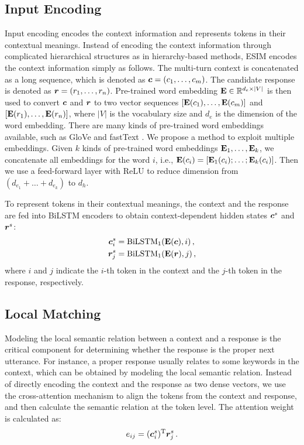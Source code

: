 \documentclass[letterpaper]{article} \usepackage{aaai19}  \usepackage{times}  \usepackage{helvet}  \usepackage{courier}  \usepackage{url}  \usepackage{graphicx}
\newcommand{\mat}[1]{\bf{#1}}
\newcommand{\RR}{\mathbb{R}}
\begin{document}
\subsection{Input Encoding}
\label{sec:input}
Input encoding encodes the context information and represents tokens in their contextual meanings. Instead of encoding the context information through complicated hierarchical structures as in hierarchy-based methods, ESIM encodes the context information simply as follows. The multi-turn context is concatenated as a long sequence, which is denoted as $\bm{c} = (c_1,\dots,c_m)$. The candidate response is denoted as $\bm{r} = (r_1,\dots,r_{n})$. Pre-trained word embedding ${\mat E} \in \RR^{d_e \times |V|}$ is then used to convert $\bm{c}$ and $\bm{r}$ to two vector sequences $[{\mat E}(c_1),\dots,{\mat E}(c_m)]$ and $[{\mat E}(r_1),\dots,{\mat E}(r_n)]$, where $|V|$ is the vocabulary size and $d_e$ is the dimension of the word embedding. There are many kinds of pre-trained word embeddings available, such as GloVe \cite{DBLP:conf/emnlp/PenningtonSM14} and fastText \cite{DBLP:conf/lrec/MikolovGBPJ18}. We propose a method to exploit multiple embeddings. Given $k$ kinds of pre-trained word embeddings ${\mat E}_1, \dots, {\mat E}_k$, we concatenate all embeddings for the word $i$, i.e., ${\mat E}(c_i) = [{\mat E}_1(c_i);\dots;{\mat E}_k(c_i)]$. Then we use a feed-forward layer with ReLU to reduce dimension from $(d_{e_1}+\dots+d_{e_k})$ to $d_h$.

To represent tokens in their contextual meanings, the context and the response are fed into BiLSTM encoders to obtain context-dependent hidden states ${\bm{c}}^s$ and ${\bm{r}}^s$:
\begin{align}
{\vect c}^s_i &=\mathrm{BiLSTM}_1({\mat E}(\vect{c}),i) \,,\\
{\vect r}^s_j &=\mathrm{BiLSTM}_1({\mat E}(\vect{r}),j) \,,
\end{align}
\noindent where $i$ and $j$ indicate the $i$-th token in the context and the $j$-th token in the response, respectively.

\subsection{Local Matching}
Modeling the local semantic relation between a context and a response is the critical component for determining whether the response is the proper next utterance. For instance, a proper response usually relates to some keywords in the context, which can be obtained by modeling the local semantic relation. 
Instead of directly encoding the context and the response as two dense vectors, we use the cross-attention mechanism to align the tokens from the context and response, and then calculate the semantic relation at the token level. The attention weight is calculated as:
\begin{equation}
e_{ij} = ({\bm{c}}^s_i)^\mathrm{T} {\bm{r}}^s_j \,.
\label{eq:eij}
\end{equation}
\end{document}

